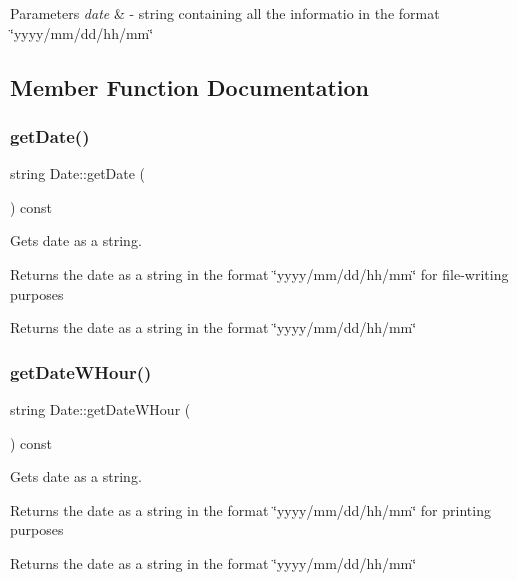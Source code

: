 \begin{DoxyParams}{Parameters}
{\em date} & -\/ string containing all the informatio in the format \char`\"{}yyyy/mm/dd/hh/mm\char`\"{} \\
\hline
\end{DoxyParams}


\subsection{Member Function Documentation}
\mbox{\label{class_date_ac33192f734973548e97e9b5d8da44a5b}} 
\subsubsection{\texorpdfstring{get\+Date()}{getDate()}}
{\footnotesize\ttfamily string Date\+::get\+Date (\begin{DoxyParamCaption}{ }\end{DoxyParamCaption}) const}



Gets date as a string. 

Returns the date as a string in the format \char`\"{}yyyy/mm/dd/hh/mm\char`\"{} for file-\/writing purposes

\begin{DoxyReturn}{Returns}
the date as a string in the format \char`\"{}yyyy/mm/dd/hh/mm\char`\"{} 
\end{DoxyReturn}
\mbox{\label{class_date_a1c481aea42a3a310364f9a97661bee14}} 
\subsubsection{\texorpdfstring{get\+Date\+W\+Hour()}{getDateWHour()}}
{\footnotesize\ttfamily string Date\+::get\+Date\+W\+Hour (\begin{DoxyParamCaption}{ }\end{DoxyParamCaption}) const}



Gets date as a string. 

Returns the date as a string in the format \char`\"{}yyyy/mm/dd/hh/mm\char`\"{} for printing purposes

\begin{DoxyReturn}{Returns}
the date as a string in the format \char`\"{}yyyy/mm/dd/hh/mm\char`\"{} 
\end{DoxyReturn}
\mbox{\label{class_date_af02c2f0b61b6e14efbc3ccb0f7f0d567}} 
